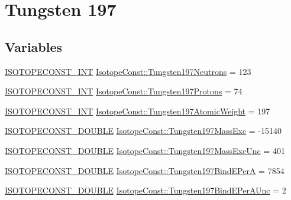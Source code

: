 \hypertarget{group___isotope_const-_tungsten-_w197}{}\section{Tungsten 197}
\label{group___isotope_const-_tungsten-_w197}
\subsection*{Variables}
\begin{DoxyCompactItemize}
\item 
\mbox{\hyperlink{group___isotope_const-_macros_ga5f18360b3e99483a35c32d789e62621c}{I\+S\+O\+T\+O\+P\+E\+C\+O\+N\+S\+T\+\_\+\+I\+NT}} \mbox{\hyperlink{group___isotope_const-_tungsten-_w197_gaa2d68d99b240ed7603ce8fdc0e141cf1}{Isotope\+Const\+::\+Tungsten197\+Neutrons}} = 123
\item 
\mbox{\hyperlink{group___isotope_const-_macros_ga5f18360b3e99483a35c32d789e62621c}{I\+S\+O\+T\+O\+P\+E\+C\+O\+N\+S\+T\+\_\+\+I\+NT}} \mbox{\hyperlink{group___isotope_const-_tungsten-_w197_gafc902ee4c1d02a7a08091a935b741156}{Isotope\+Const\+::\+Tungsten197\+Protons}} = 74
\item 
\mbox{\hyperlink{group___isotope_const-_macros_ga5f18360b3e99483a35c32d789e62621c}{I\+S\+O\+T\+O\+P\+E\+C\+O\+N\+S\+T\+\_\+\+I\+NT}} \mbox{\hyperlink{group___isotope_const-_tungsten-_w197_ga13c8249bb3c0f9a757afb3a82cd3687f}{Isotope\+Const\+::\+Tungsten197\+Atomic\+Weight}} = 197
\item 
\mbox{\hyperlink{group___isotope_const-_macros_ga8f45a7272ce02c0b4c65c44636ed719a}{I\+S\+O\+T\+O\+P\+E\+C\+O\+N\+S\+T\+\_\+\+D\+O\+U\+B\+LE}} \mbox{\hyperlink{group___isotope_const-_tungsten-_w197_ga9f95faf5eff688935a463c5611be22b5}{Isotope\+Const\+::\+Tungsten197\+Mass\+Exc}} = -\/15140
\item 
\mbox{\hyperlink{group___isotope_const-_macros_ga8f45a7272ce02c0b4c65c44636ed719a}{I\+S\+O\+T\+O\+P\+E\+C\+O\+N\+S\+T\+\_\+\+D\+O\+U\+B\+LE}} \mbox{\hyperlink{group___isotope_const-_tungsten-_w197_ga040ab718bf979a399a9ea15acd1c24eb}{Isotope\+Const\+::\+Tungsten197\+Mass\+Exc\+Unc}} = 401
\item 
\mbox{\hyperlink{group___isotope_const-_macros_ga8f45a7272ce02c0b4c65c44636ed719a}{I\+S\+O\+T\+O\+P\+E\+C\+O\+N\+S\+T\+\_\+\+D\+O\+U\+B\+LE}} \mbox{\hyperlink{group___isotope_const-_tungsten-_w197_ga8b51c96e8a86a12a2f30b1a4ccdd4243}{Isotope\+Const\+::\+Tungsten197\+Bind\+E\+PerA}} = 7854
\item 
\mbox{\hyperlink{group___isotope_const-_macros_ga8f45a7272ce02c0b4c65c44636ed719a}{I\+S\+O\+T\+O\+P\+E\+C\+O\+N\+S\+T\+\_\+\+D\+O\+U\+B\+LE}} \mbox{\hyperlink{group___isotope_const-_tungsten-_w197_ga6599817b6cd6f156e426e1f6d7efd157}{Isotope\+Const\+::\+Tungsten197\+Bind\+E\+Per\+A\+Unc}} = 2

\end{DoxyCompactItemize}
